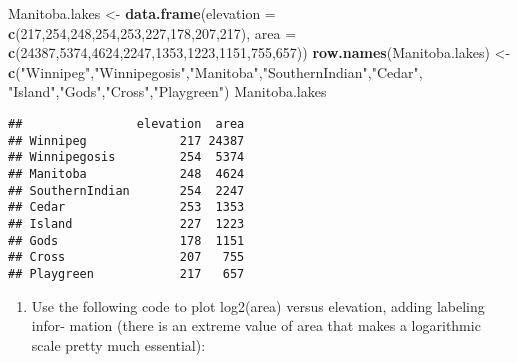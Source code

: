 \documentclass[hyperref,]{ctexart}
\newenvironment{Shaded}{\begin{snugshade}}{\end{snugshade}}
\newcommand{\DataTypeTok}[1]{\textcolor[rgb]{0.13,0.29,0.53}{#1}}
\newcommand{\DecValTok}[1]{\textcolor[rgb]{0.00,0.00,0.81}{#1}}
\newcommand{\KeywordTok}[1]{\textcolor[rgb]{0.13,0.29,0.53}{\textbf{#1}}}
\newcommand{\NormalTok}[1]{#1}
\newcommand{\StringTok}[1]{\textcolor[rgb]{0.31,0.60,0.02}{#1}}
\providecommand{\tightlist}{%
  \setlength{\itemsep}{0pt}\setlength{\parskip}{0pt}}
\begin{document}
\begin{Shaded}
\begin{Highlighting}[]
\NormalTok{Manitoba.lakes <-}\StringTok{ }\KeywordTok{data.frame}\NormalTok{(}\DataTypeTok{elevation =} \KeywordTok{c}\NormalTok{(}\DecValTok{217}\NormalTok{,}\DecValTok{254}\NormalTok{,}\DecValTok{248}\NormalTok{,}\DecValTok{254}\NormalTok{,}\DecValTok{253}\NormalTok{,}\DecValTok{227}\NormalTok{,}\DecValTok{178}\NormalTok{,}\DecValTok{207}\NormalTok{,}\DecValTok{217}\NormalTok{),}
                             \DataTypeTok{area =} \KeywordTok{c}\NormalTok{(}\DecValTok{24387}\NormalTok{,}\DecValTok{5374}\NormalTok{,}\DecValTok{4624}\NormalTok{,}\DecValTok{2247}\NormalTok{,}\DecValTok{1353}\NormalTok{,}\DecValTok{1223}\NormalTok{,}\DecValTok{1151}\NormalTok{,}\DecValTok{755}\NormalTok{,}\DecValTok{657}\NormalTok{))}
\KeywordTok{row.names}\NormalTok{(Manitoba.lakes) <-}\StringTok{ }\KeywordTok{c}\NormalTok{(}\StringTok{"Winnipeg"}\NormalTok{,}\StringTok{"Winnipegosis"}\NormalTok{,}\StringTok{"Manitoba"}\NormalTok{,}\StringTok{"SouthernIndian"}\NormalTok{,}\StringTok{"Cedar"}\NormalTok{,}
                               \StringTok{"Island"}\NormalTok{,}\StringTok{"Gods"}\NormalTok{,}\StringTok{"Cross"}\NormalTok{,}\StringTok{"Playgreen"}\NormalTok{)}
\NormalTok{Manitoba.lakes}
\end{Highlighting}
\end{Shaded}

\begin{verbatim}
##                elevation  area
## Winnipeg             217 24387
## Winnipegosis         254  5374
## Manitoba             248  4624
## SouthernIndian       254  2247
## Cedar                253  1353
## Island               227  1223
## Gods                 178  1151
## Cross                207   755
## Playgreen            217   657
\end{verbatim}

\begin{enumerate}
\def\labelenumi{(\alph{enumi})}
\tightlist
\item
  Use the following code to plot log2(area) versus elevation, adding
  labeling infor- mation (there is an extreme value of area that makes a
  logarithmic scale pretty much essential):
\end{enumerate}
\end{document}

